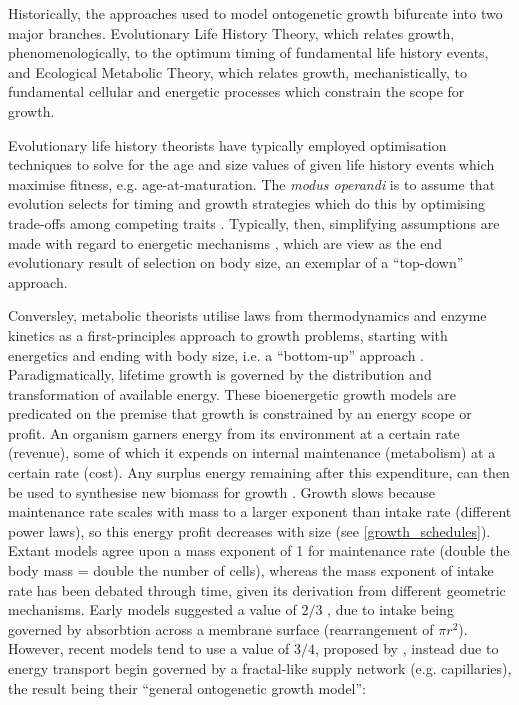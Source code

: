 \documentclass[a4paper]{article} %
\begin{document}
    Historically, the approaches used to model ontogenetic growth bifurcate into two major branches. Evolutionary Life History Theory, which relates growth, phenomenologically, to the optimum timing of fundamental life history events, and Ecological Metabolic Theory, which relates growth, mechanistically, to fundamental cellular and energetic processes which constrain the scope for growth.
        
    Evolutionary life history theorists have typically employed optimisation techniques to solve for the age and size values of given life history events which maximise fitness, e.g. age-at-maturation. The \textit{modus operandi} is to assume that evolution selects for timing and growth strategies which do this by optimising trade-offs among competing traits \autocite{Day1997, Stearns1989, stearns1992evolution}. Typically, then, simplifying assumptions are made with regard to energetic mechanisms \autocite{Day1997, Kozowski1987-indeterminate}, which are view as the end evolutionary result of selection on body size, an exemplar of a ``top-down'' approach.
        
    Conversley, metabolic theorists utilise laws from thermodynamics and enzyme kinetics as a first-principles approach to growth problems, starting with energetics and ending with body size, i.e. a ``bottom-up'' approach \autocite{Brown2004}. Paradigmatically, lifetime growth is governed by the distribution and transformation of available energy. These bioenergetic growth models are predicated on the premise that growth is constrained by an energy scope or profit. An organism garners energy from its environment at a certain rate (revenue), some of which it expends on internal maintenance (metabolism) at a certain rate (cost). Any surplus energy remaining after this expenditure, can then be used to synthesise new biomass for growth \autocite{Holdway1984, Rochet2001}. Growth slows because maintenance rate scales with mass to a larger exponent than intake rate (different power laws), so this energy profit decreases with size (see \cref{growth_schedules}). Extant models agree upon a mass exponent of 1 for maintenance rate (double the body mass = double the number of cells), whereas the mass exponent of intake rate has been debated through time, given its derivation from different geometric mechanisms. Early models suggested a value of $2/3$ \autocite{Putter1920,vonBert1938, VonBertalanffy1957}, due to intake being governed by absorbtion across a membrane surface (rearrangement of $\pi r^2$). However, recent models tend to use a value of $3/4$, proposed by \textcite{West1997}, instead due to energy transport begin governed by a fractal-like supply network (e.g. capillaries), the result being their ``general ontogenetic growth model'':
\end{document}
